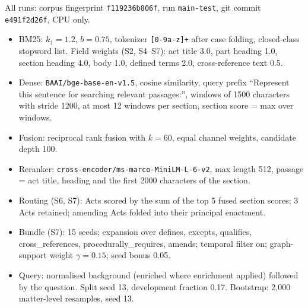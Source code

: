 \small
All runs: corpus fingerprint \texttt{f119236b806f}, run \texttt{main-test}, git commit \texttt{e491f2d26f}, CPU only.
\begin{itemize}\setlength{\itemsep}{0pt}
\item BM25: $k_1=1.2$, $b=0.75$, tokenizer \texttt{[0-9a-z]+} after case folding, closed-class stopword list. Field weights (S2, S4--S7): act title 3.0, part heading 1.0, section heading 4.0, body 1.0, defined terms 2.0, cross-reference text 0.5.
\item Dense: \texttt{BAAI/bge-base-en-v1.5}, cosine similarity, query prefix ``Represent this sentence for searching relevant passages:'', windows of 1500 characters with stride 1200, at most 12 windows per section, section score = max over windows.
\item Fusion: reciprocal rank fusion with $k=60$, equal channel weights, candidate depth 100.
\item Reranker: \texttt{cross-encoder/ms-marco-MiniLM-L-6-v2}, max length 512, passage = act title, heading and the first 2000 characters of the section.
\item Routing (S6, S7): Acts scored by the sum of the top 5 fused section scores; 3 Acts retained; amending Acts folded into their principal enactment.
\item Bundle (S7): 15 seeds; expansion over defines, excepts, qualifies, cross\_references, procedurally\_requires, amends; temporal filter on; graph-support weight $\gamma=0.15$; seed bonus 0.05.
\item Query: normalised background (enriched where enrichment applied) followed by the question. Split seed 13, development fraction 0.17. Bootstrap: 2,000 matter-level resamples, seed 13.
\end{itemize}
